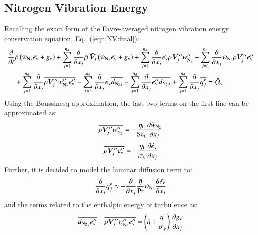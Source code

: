 \documentclass{warpdoc}
\newcommand{\alb}{\vspace{0.2cm}\\} %
\newcommand{\Sct}{{{\rm Sc}_{\rm t}}}
\newcommand{\nd}{{{n}_{\rm d}}}
\newcommand{\turb}{_{\rm t}}
\newcommand{\etat}{{\eta\turb}}
\newcommand{\ev}{e_{\rm v}}
\newcommand{\cNtwo}{w_{\rm N_2}}
\newcommand{\sigmav}{\sigma_{\rm v}}
\begin{document}
\subsection{Nitrogen Vibration Energy}

Recalling the exact form of the Favre-averaged nitrogen vibration energy conservation equation, Eq.\ (\ref{eqn:NV:final}):
%
\begin{align}
     \frac{\partial}{\partial t} &\wbar{\rho} \left( {\wtilde{w}_{\rm N_2}}  \wtilde{\ev} + g_{\rm v}\right)
  +  \sum_{j=1}^{\nd} \frac{\partial}{\partial x_j} \wbar{\rho}\, {\wtilde{\bm{V}}_j} \left( {\wtilde{w}_{\rm N_2}} {\wtilde{\ev}} + g_{\rm v}\right)
  +  \sum_{j=1}^{\nd} \frac{\partial}{\partial x_j}{\wtilde{\ev}} \overline{\rho \bm{V}_j^{\prime\prime} \cNtwo^{\prime\prime}}
  +  \sum_{j=1}^{\nd} \frac{\partial}{\partial x_j}{\wtilde{w}_{\rm N_2}} \overline{\rho \bm{V}_j^{\prime\prime} \ev^{\prime\prime}}\nonumber\alb
%
       &+\sum_{j=1}^{\nd} \frac{\partial}{\partial x_j}\overline{\rho \bm{V}_j^{\prime\prime} \cNtwo^{\prime\prime} \ev^{\prime\prime}} 
- \sum_{j=1}^{\nd} \frac{\partial }{\partial x_j} \wtilde{\ev} \overline{d_{{\rm N_2}j}}
   - \sum_{j=1}^{\nd} \frac{\partial }{\partial x_j} \overline{\ev^{\prime\prime} d_{{\rm N_2}j}}
         + \sum_{j=1}^{\nd} \frac{\partial }{\partial x_j} \overline{q_j^{\rm v}} = \wbar{Q}_{\rm v}
\end{align}
%
Using the Boussinesq approximation, the last two terms on the first line can be approximated
as:
%
\begin{equation}
  \overline{\rho \bm{V}_j^{{\prime\prime}} w_{\rm N_2}^{{\prime\prime}}}
    = -\frac{\etat}{\Sct} \frac{\partial {\wtilde{w}_{\rm N_2}}}{\partial x_j}
\end{equation}
%
%
\begin{equation}
  \overline{\rho \bm{V}_j^{{\prime\prime}} \ev^{{\prime\prime}}}=-\frac{\etat}{\sigmav} \frac{\partial \wtilde{\ev}}{\partial x_j}
  \label{eqn:NV:modelled:3}
\end{equation}
%
Further, it is decided to model the laminar diffusion term to:
%
\begin{equation}
\frac{\partial }{\partial x_j} \overline{q^{\rm v}_j    }
\approx
-\frac{\partial }{\partial x_j} \frac{\wbar{\eta}}{\Pr}\wtilde{w}_{\rm N_2} \frac{\partial \wtilde{\ev}}{\partial x_j}
  \label{eqn:NV:modelled:4}
\end{equation}
%
and the terms related to the enthalpic energy of turbulence as:
%
\begin{equation}
   \overline{d_{{\rm N_2}j}\ev^{{\prime\prime}} }    -\overline{\rho \bm{V}_j^{{\prime\prime}} \cNtwo^{{\prime\prime}} \ev^{{\prime\prime}}} 
 = \left( \wbar{\eta}+\frac{\etat}{\sigma_g} \right) \frac{\partial g_{\rm v}}{\partial x_j}
\end{equation}
\end{document}
